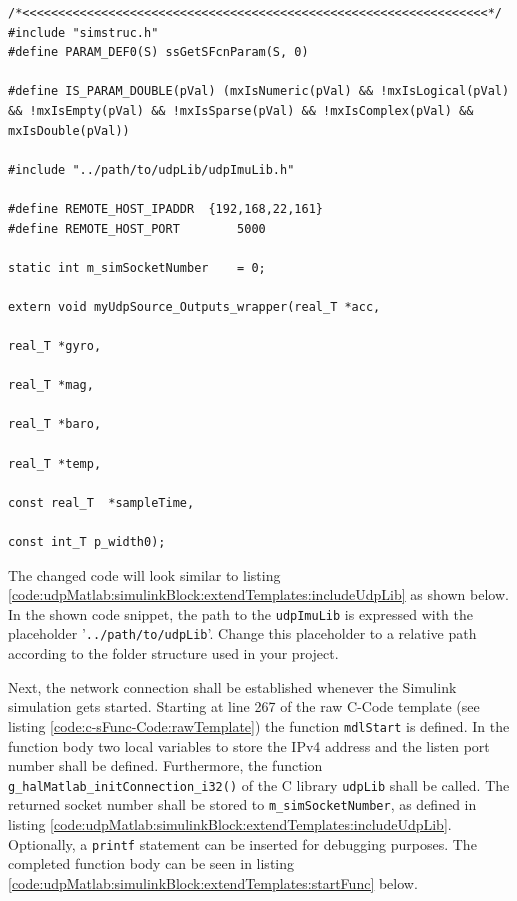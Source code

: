 \begin{lstlisting}[caption={[\texttt{myUdpSource.c} extended by include statement]C-Code template file 'myUdpSource.c' extended by a include statement to link the \texttt{udpLib} library (code snippet of listing \ref{code:c-sFunc-Code:rawTemplate}, lines 143 ll.)},label=code:udpMatlab:simulinkBlock:extendTemplates:includeUdpLib,firstnumber=143]
/*<<<<<<<<<<<<<<<<<<<<<<<<<<<<<<<<<<<<<<<<<<<<<<<<<<<<<<<<<<<<<<<<<*/
#include "simstruc.h"
#define PARAM_DEF0(S) ssGetSFcnParam(S, 0)

#define IS_PARAM_DOUBLE(pVal) (mxIsNumeric(pVal) && !mxIsLogical(pVal) && !mxIsEmpty(pVal) && !mxIsSparse(pVal) && !mxIsComplex(pVal) && mxIsDouble(pVal))

#include "../path/to/udpLib/udpImuLib.h"

#define REMOTE_HOST_IPADDR	{192,168,22,161}
#define REMOTE_HOST_PORT		5000

static int m_simSocketNumber 	= 0;

extern void myUdpSource_Outputs_wrapper(real_T *acc,
																				real_T *gyro,
																				real_T *mag,
																				real_T *baro,
																				real_T *temp, 
																				const real_T  *sampleTime, 
																				const int_T p_width0);
\end{lstlisting}

The changed code will look similar to listing \ref{code:udpMatlab:simulinkBlock:extendTemplates:includeUdpLib} as shown below. In the shown code snippet, the path to the \texttt{udpImuLib} is expressed with the placeholder '\texttt{../path/to/udpLib}'. Change this placeholder to a relative path according to the folder structure used in your project.

Next, the network connection shall be established whenever the Simulink simulation gets started. Starting at line 267 of the raw C-Code template (see listing \ref{code:c-sFunc-Code:rawTemplate}) the function \texttt{mdlStart} is defined. In the function body two local variables to store the IPv4 address and the listen port number shall be defined. Furthermore, the function \texttt{g\_halMatlab\_initConnection\_i32()} of the C library \texttt{udpLib} shall be called. The returned socket number shall be stored to \texttt{m\_simSocketNumber}, as defined in listing \ref{code:udpMatlab:simulinkBlock:extendTemplates:includeUdpLib}. Optionally, a \texttt{printf} statement can be inserted for debugging purposes. The completed function body can be seen in listing \ref{code:udpMatlab:simulinkBlock:extendTemplates:startFunc} below.

